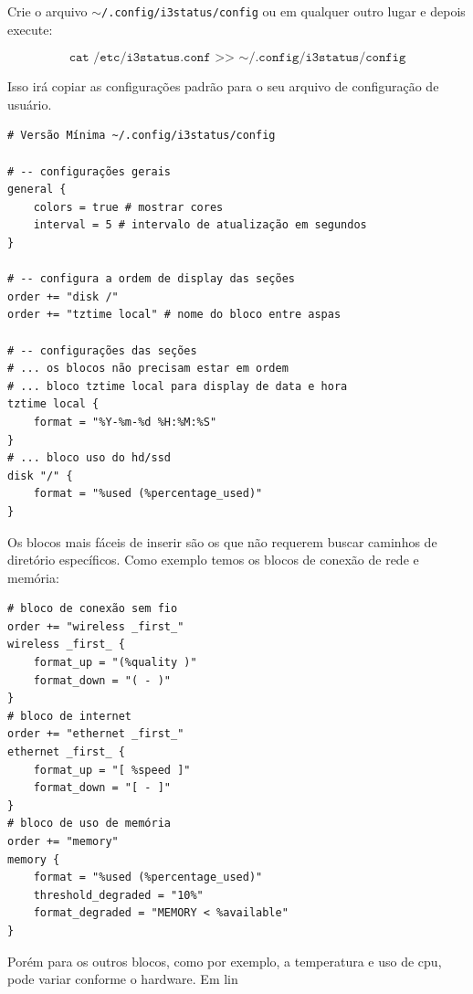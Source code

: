 \documentclass[12pt,a4paper]{article}
\begin{document}
Crie o arquivo \texttt{$\sim$/.config/i3status/config} ou em qualquer outro lugar e depois execute:

$$\texttt{cat /etc/i3status.conf >> $\sim$/.config/i3status/config}$$

Isso irá copiar as configurações padrão para o seu arquivo de configuração de usuário. \\

\begin{lstlisting}
# Versão Mínima ~/.config/i3status/config

# -- configurações gerais
general {
    colors = true # mostrar cores
    interval = 5 # intervalo de atualização em segundos
}

# -- configura a ordem de display das seções
order += "disk /"
order += "tztime local" # nome do bloco entre aspas

# -- configurações das seções 
# ... os blocos não precisam estar em ordem 
# ... bloco tztime local para display de data e hora
tztime local { 
    format = "%Y-%m-%d %H:%M:%S"
}
# ... bloco uso do hd/ssd
disk "/" {
    format = "%used (%percentage_used)"
}
\end{lstlisting} 

Os blocos mais fáceis de inserir são os que não requerem buscar caminhos de diretório específicos. Como exemplo temos os blocos de conexão de rede e memória: \\

\begin{lstlisting}
# bloco de conexão sem fio 
order += "wireless _first_"
wireless _first_ {
    format_up = "(%quality )"
    format_down = "( - )"
}
# bloco de internet 
order += "ethernet _first_"
ethernet _first_ {
    format_up = "[ %speed ]"
    format_down = "[ - ]"
}
# bloco de uso de memória 
order += "memory"
memory {
    format = "%used (%percentage_used)"
    threshold_degraded = "10%"
    format_degraded = "MEMORY < %available"
}
\end{lstlisting}

\vspace{\baselineskip}

Porém para os outros blocos, como por exemplo, a temperatura e uso de cpu, pode variar conforme o hardware. Em lin
\end{document}
